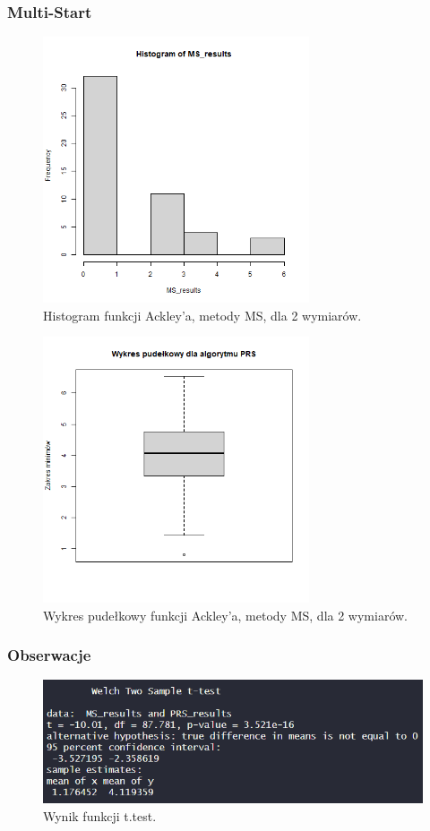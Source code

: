 \documentclass{lab}
\begin{document}
\subsubsection{Multi-Start}
\begin{figure}[H]
  \centering
  \includegraphics[width=0.7\textwidth]{img/dim2_MS_Ackley_his.png}
  \caption{Histogram funkcji Ackley'a, metody MS, dla 2 wymiarów.}
\end{figure}
\begin{figure}[H]
  \centering
  \includegraphics[width=0.7\textwidth]{img/dim2_MS_Ackley.png}
  \caption{Wykres pudełkowy funkcji Ackley'a, metody MS, dla 2 wymiarów.}
\end{figure}

\subsubsection{Obserwacje}
 \begin{figure}[H]
     \centering
     \includegraphics[width=0.9\linewidth]{img/T2.png}
     \caption{Wynik funkcji t.test.}
     \label{fig:enter-label}
 \end{figure}
\end{document}
